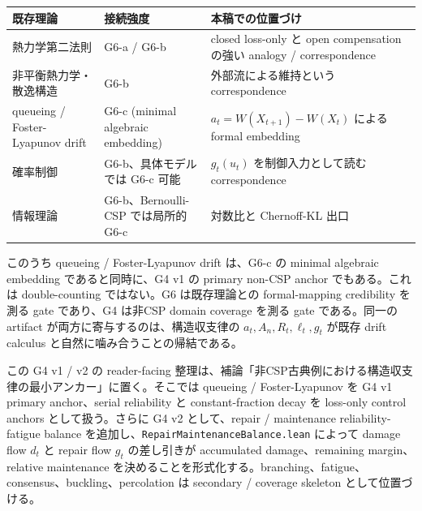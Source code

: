 \documentclass[12pt,a4paper]{article}
\begin{document}
{\def\LTcaptype{table} %
\begin{longtable}[]{@{}
  >{\raggedright\arraybackslash}p{}
  >{\raggedright\arraybackslash}p{}
  >{\raggedright\arraybackslash}p{}@{}}
\toprule\noalign{}
\begin{minipage}[b]{\linewidth}\raggedright
既存理論
\end{minipage} & \begin{minipage}[b]{\linewidth}\raggedright
接続強度
\end{minipage} & \begin{minipage}[b]{\linewidth}\raggedright
本稿での位置づけ
\end{minipage} \\
\midrule\noalign{}
\endhead
\bottomrule\noalign{}
\endlastfoot
熱力学第二法則 & G6-a / G6-b & closed loss-only と open compensation の強い analogy / correspondence \\
非平衡熱力学・散逸構造 & G6-b & 外部流による維持という correspondence \\
queueing / Foster-Lyapunov drift & G6-c (minimal algebraic embedding) & \(a_t=W(X_{t+1})-W(X_t)\) による formal embedding \\
確率制御 & G6-b、具体モデルでは G6-c 可能 & \(g_t(u_t)\) を制御入力として読む correspondence \\
情報理論 & G6-b、Bernoulli-CSP では局所的 G6-c & 対数比と Chernoff-KL 出口 \\
\end{longtable}
}

このうち queueing / Foster-Lyapunov drift は、G6-c の minimal algebraic embedding であると同時に、G4 v1 の primary non-CSP anchor でもある。これは double-counting ではない。G6 は既存理論との formal-mapping credibility を測る gate であり、G4 は非CSP domain coverage を測る gate である。同一の artifact が両方に寄与するのは、構造収支律の \(a_{t},A_{n},R_{t},\ell_{t},g_{t}\) が既存 drift calculus と自然に噛み合うことの帰結である。

この G4 v1 / v2 の reader-facing 整理は、補論「非CSP古典例における構造収支律の最小アンカー」に置く。そこでは queueing / Foster-Lyapunov を G4 v1 primary anchor、serial reliability と constant-fraction decay を loss-only control anchors として扱う。さらに G4 v2 として、repair / maintenance reliability-fatigue balance を追加し、\texttt{RepairMaintenanceBalance.lean} によって damage flow \(d_{t}\) と repair flow \(g_{t}\) の差し引きが accumulated damage、remaining margin、relative maintenance を決めることを形式化する。branching、fatigue、consensus、buckling、percolation は secondary / coverage skeleton として位置づける。
\end{document}
